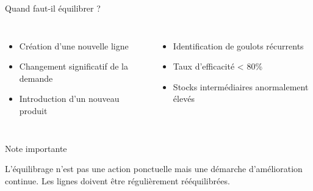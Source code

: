 \documentclass{beamer}
\newenvironment{importantnote}
{%
    \begin{block}{Note importante}
}
{%
    \end{block}
}
\begin{document}
\begin{frame}{Quand faut-il équilibrer ?}
    \begin{columns}
        \begin{itemize}
            \item Création d'une nouvelle ligne
            \item Changement significatif de la demande
            \item Introduction d'un nouveau produit
        \end{itemize}
        
        \begin{itemize}
            \item Identification de goulots récurrents
            \item Taux d'efficacité < 80\%
            \item Stocks intermédiaires anormalement élevés
        \end{itemize}
    \end{columns}
    
    \vspace{0.5cm}
    \begin{importantnote}
        L'équilibrage n'est pas une action ponctuelle mais une démarche d'amélioration continue. Les lignes doivent être régulièrement rééquilibrées.
    \end{importantnote}
\end{frame}
\end{document}
